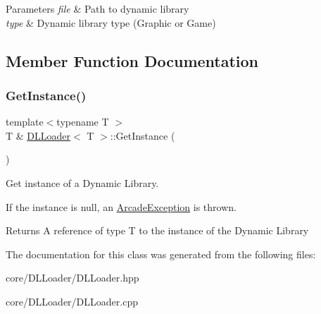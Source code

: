 \begin{DoxyParams}{Parameters}
{\em file} & Path to dynamic library \\
\hline
{\em type} & Dynamic library type (Graphic or Game) \\
\hline
\end{DoxyParams}


\subsection{Member Function Documentation}
\mbox{\label{class_d_l_loader_a7a023d81af75b962bddcef178b92e4c4}} 
\subsubsection{\texorpdfstring{Get\+Instance()}{GetInstance()}}
{\footnotesize\ttfamily template$<$typename T $>$ \\
T \& \hyperlink{class_d_l_loader}{D\+L\+Loader}$<$ T $>$\+::Get\+Instance (\begin{DoxyParamCaption}{ }\end{DoxyParamCaption})}



Get instance of a Dynamic Library. 

If the instance is null, an \hyperlink{class_arcade_exception}{Arcade\+Exception} is thrown.

\begin{DoxyReturn}{Returns}
A reference of type T to the instance of the Dynamic Library 
\end{DoxyReturn}


The documentation for this class was generated from the following files\+:\begin{DoxyCompactItemize}
\item 
core/\+D\+L\+Loader/D\+L\+Loader.\+hpp\item 
core/\+D\+L\+Loader/D\+L\+Loader.\+cpp\end{DoxyCompactItemize}
